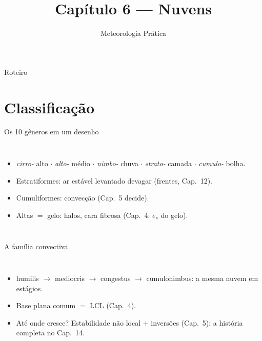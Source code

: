 \documentclass[aspectratio=169,11pt]{beamer}
\title[Cap. 6 --- Nuvens]{Capítulo 6 --- Nuvens}
\subtitle{Meteorologia Prática}
\author{}
\date{}
\begin{document}
\begin{frame}
  \titlepage
  \vfill
  \atribuicao
\end{frame}

\begin{frame}{Roteiro}
  \tableofcontents
\end{frame}

\section{Classificação}

\begin{frame}{Os 10 gêneros em um desenho}
  \begin{columns}
    \begin{itemize}
      \item \emph{cirro-} alto $\cdot$ \emph{alto-} médio $\cdot$
            \emph{nimbo-} chuva $\cdot$ \emph{strato-} camada $\cdot$
            \emph{cumulo-} bolha.
      \item Estratiformes: ar estável levantado devagar (frentes,
            Cap.~12).
      \item Cumuliformes: convecção (Cap.~5 decide).
      \item Altas $=$ gelo: halos, cara fibrosa (Cap.~4: $e_s$ do
            gelo).
    \end{itemize}
  \end{columns}
\end{frame}

\begin{frame}{A família convectiva}
  \begin{columns}
    \begin{itemize}
      \item humilis $\to$ mediocris $\to$ congestus $\to$
            \alert{cumulonimbus}: a mesma nuvem em estágios.
      \item Base plana comum $=$ LCL (Cap.~4).
      \item Até onde cresce? Estabilidade não local $+$ inversões
            (Cap.~5); a história completa no Cap.~14.
    \end{itemize}
  \end{columns}
\end{frame}
\end{document}
